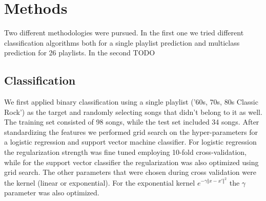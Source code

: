 \documentclass[acmtog]{acmart}
\begin{document}

\section{Methods}
\label{sec:sim}

Two different methodologies were pursued. In the first one we tried different classification algorithms both for a single playlist prediction and multiclass prediction for 26 playlists. In the second TODO

\subsection{Classification}

We first applied binary classification using a single playlist ('60s, 70s, 80s Classic Rock') as the target and randomly selecting songs that didn't belong to it as well. The training set consisted of 98 songs, while the test set included 34 songs. After standardizing the features we performed grid search on the hyper-parameters for a logistic regression and support vector machine classifier. For logistic regression the regularization strength was fine tuned employing 10-fold cross-validation, while for the support vector classifier the regularization was also optimized using grid search. The other parameters that were chosen during cross validation were the kernel (linear or exponential). For the exponential kernel $e^{-\gamma {\Vert x -x' \Vert}^{2}}$ the $\gamma$ parameter was also optimized.
\end{document}

